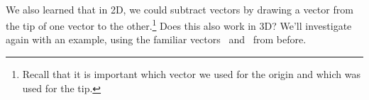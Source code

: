 {\begin{myfigure}
\begin{center}
\end{center}
\label{fig:add_3D}
\end{myfigure}
\baselineskip}\\ %

We also learned that in 2D, we could subtract vectors by drawing a vector from the tip of one vector to the other.\footnote{Recall that it is important which vector we used for the origin and which was used for the tip.} Does this also work in 3D? We'll investigate again with an example, using the familiar vectors \vv\ and \vu\ from before.\\

